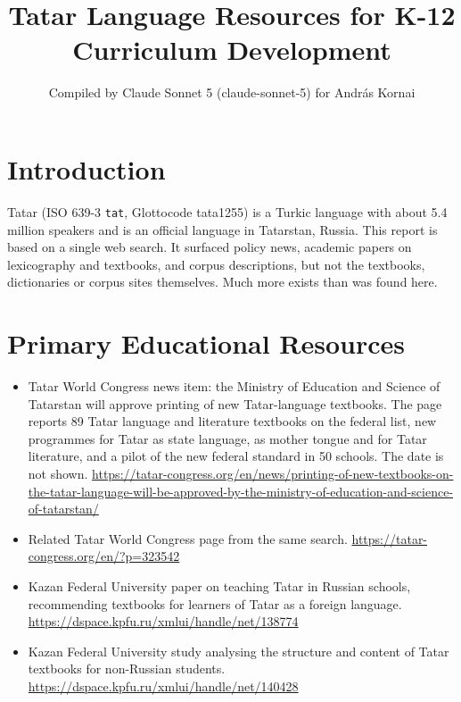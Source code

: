 \documentclass[12pt]{article}
\title{Tatar Language Resources for K-12 Curriculum Development}
\author{Compiled by Claude Sonnet 5 (claude-sonnet-5) for Andr\'as Kornai}
\date{}
\begin{document}
\maketitle

\section{Introduction}
Tatar (ISO 639-3 \texttt{tat}, Glottocode tata1255) is a Turkic language with about 5.4 million speakers and is an official language in Tatarstan, Russia. This report is based on a single web search. It surfaced policy news, academic papers on lexicography and textbooks, and corpus descriptions, but not the textbooks, dictionaries or corpus sites themselves. Much more exists than was found here.

\section{Primary Educational Resources}
\begin{itemize}
\item Tatar World Congress news item: the Ministry of Education and Science of Tatarstan will approve printing of new Tatar-language textbooks. The page reports 89 Tatar language and literature textbooks on the federal list, new programmes for Tatar as state language, as mother tongue and for Tatar literature, and a pilot of the new federal standard in 50 schools. The date is not shown. \url{https://tatar-congress.org/en/news/printing-of-new-textbooks-on-the-tatar-language-will-be-approved-by-the-ministry-of-education-and-science-of-tatarstan/}
\item Related Tatar World Congress page from the same search. \url{https://tatar-congress.org/en/?p=323542}
\item Kazan Federal University paper on teaching Tatar in Russian schools, recommending textbooks for learners of Tatar as a foreign language. \url{https://dspace.kpfu.ru/xmlui/handle/net/138774}
\item Kazan Federal University study analysing the structure and content of Tatar textbooks for non-Russian students. \url{https://dspace.kpfu.ru/xmlui/handle/net/140428}
\end{itemize}
\end{document}
